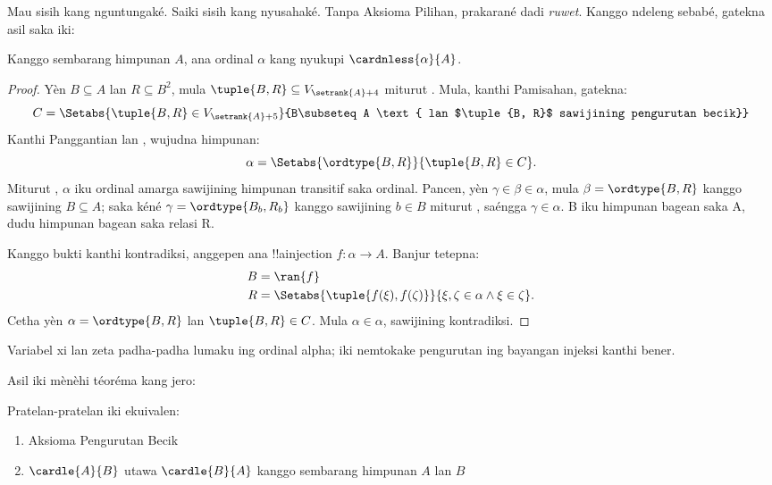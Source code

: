 \documentclass[../../../include/open-logic-section]{subfiles}
\begin{document}

Mau sisih kang nguntungaké. Saiki sisih kang nyusahaké. Tanpa
Aksioma Pilihan, prakarané dadi \emph{ruwet}. Kanggo ndeleng sebabé,
gatekna asil saka \cite{Hartogs1915} iki:

\begin{lem}
Kanggo sembarang himpunan $A$, ana ordinal $\alpha$ kang nyukupi
$\cardnless{\alpha}{A}$.
\end{lem}

\begin{proof}
Yèn $B \subseteq A$ lan $R \subseteq B^2$, mula $\tuple{B, R} \subseteq
V_{\setrank{A}+4}$ miturut
. Mula, kanthi
Pamisahan, gatekna:
\[
	C = \Setabs{\tuple{B, R} \in V_{\setrank{A}+5}}{B\subseteq A
	\text{ lan $\tuple{B, R}$ sawijining pengurutan becik}}
\]
Kanthi Panggantian lan
, wujudna himpunan:
\[
	\alpha = \Setabs{\ordtype{B, R}}{\tuple{B, R} \in C}.
\]
Miturut , $\alpha$ iku
ordinal amarga sawijining himpunan transitif saka ordinal. Pancen, yèn
$\gamma \in \beta \in \alpha$, mula $\beta = \ordtype{B, R}$ kanggo
sawijining $B \subseteq A$; saka kéné $\gamma = \ordtype{B_b, R_b}$
kanggo sawijining $b \in B$ miturut
, saéngga
$\gamma \in \alpha$.
B iku himpunan bagean saka A, dudu himpunan bagean saka relasi R.

Kanggo bukti kanthi kontradiksi, anggepen ana !!a{injection}
$f \colon \alpha \to A$. Banjur tetepna:
\begin{align*}
	B &= \ran{f}\\
	R &= \Setabs{\tuple{f(\xi), f(\zeta)}}{\xi,\zeta\in\alpha \land \xi\in\zeta}.
\end{align*}
Cetha yèn $\alpha = \ordtype{B, R}$ lan $\tuple{B, R} \in C$.
Mula $\alpha \in \alpha$, sawijining kontradiksi.
\end{proof}
Variabel xi lan zeta padha-padha lumaku ing ordinal alpha; iki nemtokake pengurutan ing bayangan injeksi kanthi bener.

Asil iki mènèhi téoréma kang jero:

\begin{thm}
Pratelan-pratelan iki ekuivalen:
\begin{enumerate}
	\item{} Aksioma Pengurutan Becik
	\item{} $\cardle{A}{B}$ utawa
	$\cardle{B}{A}$ kanggo sembarang himpunan $A$ lan $B$
\end{enumerate}
\end{thm}
\end{document}
